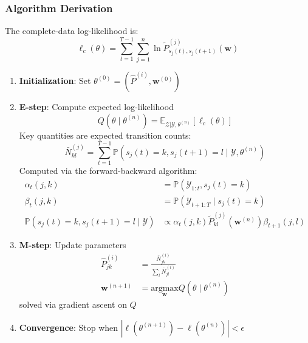 \documentclass[answers,12pt,addpoints]{exam}
\begin{document}
\subsubsection{Algorithm Derivation}
The complete-data log-likelihood is:
\begin{equation}
    \ell_c(\theta) = \sum_{t=1}^{T-1} \sum_{j=1}^{n} \ln \widetilde{P}^{(j)}_{s_j(t), s_j(t+1)}(\mathbf{w})
\end{equation}

\begin{enumerate}
    \item \textbf{Initialization}: Set $\theta^{(0)} = (\hat{P}^{(i)}, \mathbf{w}^{(0)})$
    
    \item \textbf{E-step}: Compute expected log-likelihood
    \begin{equation}
        Q(\theta \mid \theta^{(n)}) = \mathbb{E}_{\mathscr{Z}|\mathscr{Y}, \theta^{(n)}} [\ell_c(\theta)]
    \end{equation}
    Key quantities are expected transition counts:
    \begin{equation}
        \bar{N}^{(j)}_{kl} = \sum_{t=1}^{T-1} \mathbb{P}(s_j(t)=k, s_j(t+1)=l \mid \mathscr{Y}, \theta^{(n)})
    \end{equation}
    Computed via the forward-backward algorithm:
    \begin{align}
        \alpha_t(j,k) &= \mathbb{P}(\mathscr{Y}_{1:t}, s_j(t)=k) \\
        \beta_t(j,k) &= \mathbb{P}(\mathscr{Y}_{t+1:T} \mid s_j(t)=k) \\
        \mathbb{P}(s_j(t)=k, s_j(t+1)=l \mid \mathscr{Y}) &\propto \alpha_t(j,k) \widetilde{P}^{(j)}_{kl}(\mathbf{w}^{(n)}) \beta_{t+1}(j,l)
    \end{align}
    
    \item \textbf{M-step}: Update parameters
    \begin{align}
        \hat{P}^{(i)}_{jk} &= \frac{\bar{N}^{(i)}_{jk}}{\sum_l \bar{N}^{(i)}_{jl}} \\
        \mathbf{w}^{(n+1)} &= \underset{\mathbf{w}}{\mathrm{argmax}}  Q(\theta \mid \theta^{(n)})
    \end{align}
    solved via gradient ascent on $Q$
    
    \item \textbf{Convergence}: Stop when $|\ell(\theta^{(n+1)}) - \ell(\theta^{(n)})| < \epsilon$
\end{enumerate}
\end{document}
